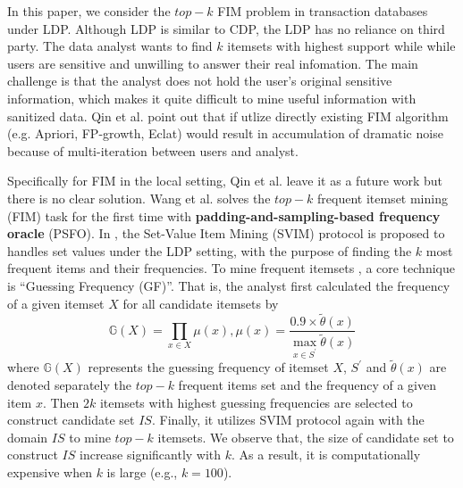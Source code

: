 \documentclass[conference]{IEEEtran}
\begin{document}
In this paper, we consider the $top-k$ FIM problem in transaction databases under LDP. Although LDP is similar to CDP, the LDP has no reliance on third party. The data analyst wants to find $k$ itemsets with highest support while while users are sensitive and unwilling to answer their real infomation. The main challenge is that the analyst does not hold the user's original sensitive information, which makes it quite difficult to mine useful information with sanitized data. Qin et al.\cite{a1} point out that if utlize directly existing FIM algorithm (e.g. Apriori\cite{apriori,apr}, FP-growth\cite{fp}, Eclat\cite{eclat}) would result in accumulation of dramatic noise because of multi-iteration between users and analyst.

Specifically for FIM in the local setting, Qin et al.\cite{a1} leave it as a future work but there is no clear solution. Wang et al.\cite{a2} solves  the $top-k$ frequent itemset mining (FIM) task for the first time with \textbf{padding-and-sampling-based frequency oracle} (PSFO). In \cite{a2}, the Set-Value Item Mining (SVIM) protocol is proposed to handles set values under the LDP setting, with the purpose of finding the $k$ most frequent items and their frequencies. To mine frequent itemsets , a core technique is {\color{red}``Guessing Frequency (GF)''}. That is, the analyst first calculated  the frequency of a given itemset $X$ for all candidate itemsets by
\begin{equation}
\mathbb{G}(X)=\prod_{x \in X} \mu(x) , \mu(x) = \frac{0.9\times \tilde{\theta}(x)}{\max \limits_{x \in S^{\prime}} \tilde{\theta}(x)}\label{gf}
\end{equation}
where $\mathbb{G}(X)$ represents the guessing frequency of itemset $X$, $S^{\prime}$ and $\tilde{\theta}(x)$ are denoted separately the $top-k$ frequent items set and the frequency of a given item $x$. Then $2k$ itemsets with highest guessing frequencies are selected to construct candidate set $IS$. Finally, it utilizes SVIM protocol again with the domain $IS$ to mine $top-k$ itemsets. We observe that, the size of candidate set to construct $IS$ increase significantly with $k$. As a result, it is computationally expensive when $k$ is large (e.g., $k=100$). 
\end{document}
